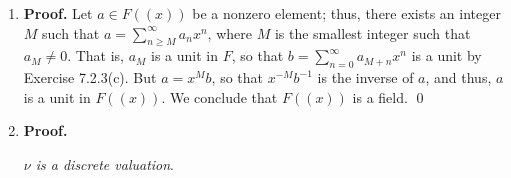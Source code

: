 \begin{enumerate}
      \begin{enumerate}
         \item \textbf{Proof.} Let $a \in F((x))$ be a nonzero element; thus,
               there exists an integer $M$ such that
               $a = \sum_{n \ge M}^\infty a_nx^n$, where $M$ is the smallest
               integer such that $a_M \neq 0$. That is, $a_M$ is a unit in $F$,
               so that $b = \sum_{n=0}^\infty a_{M+n}x^n$ is a unit by Exercise
               7.2.3(c). But $a = x^Mb$, so that $x^{-M}b^{-1}$ is the inverse
               of $a$, and thus, $a$ is a unit in $F((x))$. We conclude that
               $F((x))$ is a field. \qed
         \item \textbf{Proof.}

               \textit{$\nu$ is a discrete valuation}.


\end{enumerate}
\end{enumerate}
